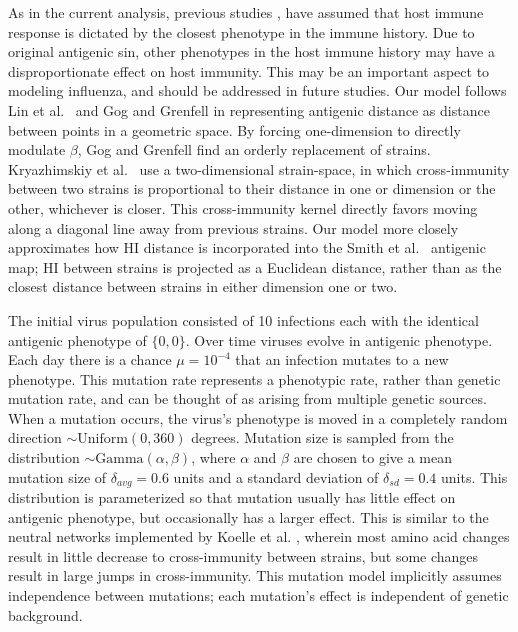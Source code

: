 \documentclass[11pt,oneside,letterpaper]{article}
\begin{document}
As in the current analysis, previous studies \cite{Ferguson03,Koelle06,Recker07}, have assumed that host immune response is dictated by the closest phenotype in the immune history.  Due to original antigenic sin, other phenotypes in the host immune history may have a disproportionate effect on host immunity.  This may be an important aspect to modeling influenza, and should be addressed in future studies.  Our model follows Lin et al.\ \cite{Lin99} and Gog and Grenfell \cite{Gog02} in representing antigenic distance as distance between points in a geometric space.  By forcing one-dimension to directly modulate $\beta$, Gog and Grenfell find an orderly replacement of strains.  Kryazhimskiy et al.\ \cite{Kryazhimskiy07} use a two-dimensional strain-space, in which cross-immunity between two strains is proportional to their distance in one or dimension or the other, whichever is closer.  This cross-immunity kernel directly favors moving along a diagonal line away from previous strains.  Our model more closely approximates how HI distance is incorporated into the Smith et al.\ \cite{Smith04} antigenic map; HI between strains is projected as a Euclidean distance, rather than as the closest distance between strains in either dimension one or two.

The initial virus population consisted of 10 infections each with the identical antigenic phenotype of $\{0,0\}$.  Over time viruses evolve in antigenic phenotype.  Each day there is a chance $\mu = 10^{-4}$ that an infection mutates to a new phenotype.  This mutation rate represents a phenotypic rate, rather than genetic mutation rate, and can be thought of as arising from multiple genetic sources.  When a mutation occurs, the virus's phenotype is moved in a completely random direction $\sim \mathrm{Uniform}(0,360)$ degrees. Mutation size is sampled from the distribution $\sim \mathrm{Gamma}(\alpha,\beta)$, where $\alpha$ and $\beta$ are chosen to give a mean mutation size of $\delta_{avg} = 0.6$ units and a standard deviation of $\delta_{sd} = 0.4$ units.  This distribution is parameterized so that mutation usually has little effect on antigenic phenotype, but occasionally has a larger effect.  This is similar to the neutral networks implemented by Koelle et al. \cite{Koelle06}, wherein most amino acid changes result in little decrease to cross-immunity between strains, but some changes result in large jumps in cross-immunity.  This mutation model implicitly assumes independence between mutations; each mutation's effect is independent of genetic background.
\end{document}

